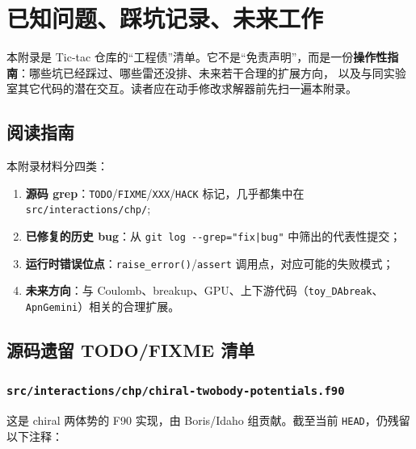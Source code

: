 
\chapter{已知问题、踩坑记录、未来工作}
\label{app:F_pitfalls_future}

本附录是 Tic-tac 仓库的“工程债”清单。它不是“免责声明”，而是一份\textbf{操作性指南}：哪些坑已经踩过、哪些雷还没排、未来若干合理的扩展方向，
以及与同实验室其它代码的潜在交互。读者应在动手修改求解器前先扫一遍本附录。

\section{阅读指南}
\label{sec:appF_intro}

本附录材料分四类：
\begin{enumerate}
  \item \textbf{源码 grep}：\texttt{TODO}/\texttt{FIXME}/\texttt{XXX}/\texttt{HACK} 标记，几乎都集中在 \texttt{src/interactions/chp/};
  \item \textbf{已修复的历史 bug}：从 \texttt{git log -{}-grep="fix|bug"} 中筛出的代表性提交；
  \item \textbf{运行时错误位点}：\texttt{raise\_error()}/\texttt{assert} 调用点，对应可能的失败模式；
  \item \textbf{未来方向}：与 Coulomb、breakup、GPU、上下游代码（\texttt{toy\_DAbreak}、\texttt{ApnGemini}）相关的合理扩展。
\end{enumerate}

\section{源码遗留 TODO/FIXME 清单}
\label{sec:appF_todo_grep}

\subsection{\texorpdfstring{\texttt{src/interactions/chp/chiral-twobody-potentials.f90}}{src/interactions/chp/chiral-twobody-potentials.f90}}
\label{subsec:appF_chp_todos}

这是 chiral 两体势的 F90 实现，由 Boris/Idaho 组贡献。截至当前 \texttt{HEAD}，仍残留以下注释：

